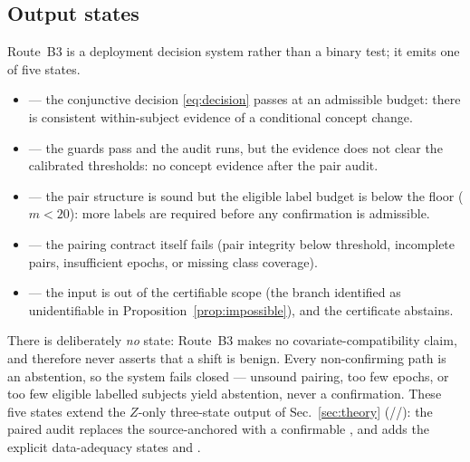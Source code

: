 \subsection{Output states}
\label{sec:b3-states}
Route~B3 is a deployment decision system rather than a binary test; it emits one of five states.
\begin{itemize}
  \item \stconf{} --- the conjunctive decision \eqref{eq:decision} passes at an admissible budget: there is
        consistent within-subject evidence of a conditional concept change.
  \item \stnoev{} --- the guards pass and the audit runs, but the evidence does not clear the calibrated
        thresholds: no concept evidence after the pair audit.
  \item \stneed{} --- the pair structure is sound but the eligible label budget is below the floor
        ($m<20$): more labels are required before any confirmation is admissible.
  \item \stinv{} --- the pairing contract itself fails (pair integrity below threshold, incomplete pairs,
        insufficient epochs, or missing class coverage).
  \item \stunid{} --- the input is out of the certifiable scope (the branch identified as unidentifiable in
        Proposition~\ref{prop:impossible}), and the certificate abstains.
\end{itemize}
There is deliberately \emph{no} \stcov{} state: Route~B3 makes no covariate-compatibility claim, and
therefore never asserts that a shift is benign. Every non-confirming path is an abstention, so the system
fails closed --- unsound pairing, too few epochs, or too few eligible labelled subjects yield abstention,
never a confirmation. These five states extend the $Z$-only three-state output of Sec.~\ref{sec:theory}
(\stcov{}/\stsus{}/\stunid{}): the paired audit replaces the source-anchored \stsus{} with a confirmable
\stconf{}, and adds the explicit data-adequacy states \stneed{} and \stinv{}. 

